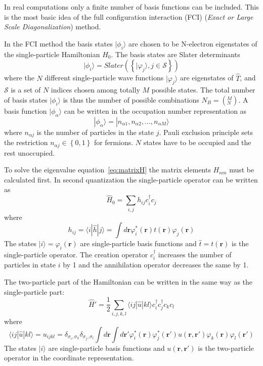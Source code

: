 In real computations only a finite number of basis functions can be included. This is the most basic idea of the full configuration interaction (FCI) (\textit{Exact or Large Scale Diagonalization}) method.

In the FCI method the basis states $|\phi_i \rangle$ are chosen to be N-electron eigenstates of the single-particle Hamiltonian $\hat{H}_0$. The basis states are Slater determinants
\begin{equation}
 |\phi_i \rangle = Slater(\left\{ |\varphi_j \rangle, j \in \mathcal{S} \right\} )
\end{equation}
where the $N$ different single-particle wave functions $|\varphi_j \rangle$ are eigenstates of $\hat{T}$, and $\mathcal{S}$ is a set of $N$ indices chosen among totally $M$ possible states. The total number of basis states $|\phi_i \rangle$ is thus the number of possible combinations $N_B = \left( ^M _N \right)$. A basis function $|\phi_{\alpha} \rangle$ can be written in the occupation number representation as
\begin{equation}
 |\phi_{\alpha} \rangle = |n_{\alpha 1},n_{\alpha 2}, ..., n_{\alpha M} \rangle
\end{equation}
where $n_{\alpha j}$ is the number of particles in the state $j$. Pauli exclusion principle sets the restriction $n_{\alpha j} \in \left\{ 0,1 \right\}$ for fermions. $N$ states have to be occupied and the rest unoccupied.

To solve the eigenvalue equation~\ref{eq:matrixH} the matrix elements $H_{nm}$ must be calculated first. In second quantization the single-particle operator can be written as~\cite{Raimes1972}
\begin{equation}
 \hat{H}_0 = \sum_{i,j} h_{ij} c^{\dagger}_i c_j
\end{equation}
where
\begin{equation}
 h_{ij} = \langle i |\hat{h} | j \rangle = \int d \mathbf{r} \varphi^*_i (\mathbf{r}) t(\mathbf{r}) \varphi_j (\mathbf{r})
\end{equation}
The states $| i \rangle = \varphi_i (\mathbf{r})$ are single-particle basis functions and $\hat{t} = t(\mathbf{r})$ is the single-particle operator. The creation operator $c^{\dagger}_i$ increases the number of particles in state $i$ by 1 and the annihilation operator decreases the same by 1.

The two-particle part of the Hamiltonian can be written in the same way as the single-particle part:
\begin{equation}
 \hat{H}' = \frac{1}{2} \sum_{i,j,k,l} \langle ij |\hat{u} | kl \rangle c^{\dagger}_i c^{\dagger}_j c_k c_l
\end{equation}
where
\begin{equation}
 \langle ij |\hat{u} | kl \rangle = u_{ijkl} = \delta_{\sigma_i,\sigma_k} \delta_{\sigma_j,\sigma_l} \int d \mathbf{r} \int d \mathbf{r'} \varphi^*_i (\mathbf{r}) \varphi^*_j (\mathbf{r'}) u(\mathbf{r},\mathbf{r'}) \varphi_k (\mathbf{r}) \varphi_l (\mathbf{r'})
\end{equation}
The states $| i \rangle$ are single-particle basis functions and $u(\mathbf{r},\mathbf{r'})$ is the two-particle operator in the coordinate representation.

